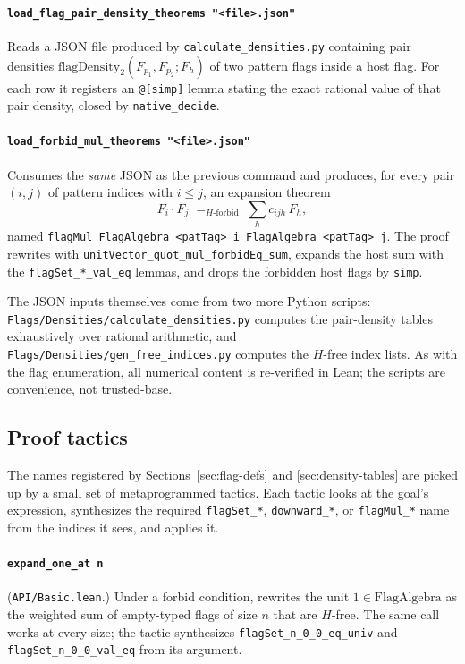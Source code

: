\documentclass[11pt]{article}
\begin{document}
\paragraph{\texttt{load\_flag\_pair\_density\_theorems "<file>.json"}}
Reads a JSON file produced by \texttt{calculate\_densities.py}
containing pair densities $\mathrm{flagDensity}_2(F_{p_1}, F_{p_2}; F_h)$
of two pattern flags inside a host flag. For each row it registers an
\texttt{@[simp]} lemma stating the exact rational value of that pair
density, closed by \texttt{native\_decide}.

\paragraph{\texttt{load\_forbid\_mul\_theorems "<file>.json"}}
Consumes the \emph{same} JSON as the previous command and produces, for
every pair $(i,j)$ of pattern indices with $i \le j$, an expansion
theorem
\[
  F_i \cdot F_j \;=_{H\text{-forbid}}\; \sum_h c_{ijh}\,F_h,
\]
named \texttt{flagMul\_FlagAlgebra\_<patTag>\_i\_FlagAlgebra\_<patTag>\_j}.
The proof rewrites with \texttt{unitVector\_quot\_mul\_forbidEq\_sum},
expands the host sum with the \texttt{flagSet\_*\_val\_eq} lemmas, and
drops the forbidden host flags by \texttt{simp}.

The JSON inputs themselves come from two more Python scripts:
\texttt{Flags/Densities/calculate\_densities.py} computes the pair-density
tables exhaustively over rational arithmetic, and
\texttt{Flags/Densities/gen\_free\_indices.py} computes the $H$-free index
lists. As with the flag enumeration, all numerical content is re-verified
in Lean; the scripts are convenience, not trusted-base.

\subsection{Proof tactics}
\label{sec:tactics}

The names registered by Sections~\ref{sec:flag-defs} and
\ref{sec:density-tables} are picked up by a small set of metaprogrammed
tactics. Each tactic looks at the goal's expression, synthesizes the
required \texttt{flagSet\_*}, \texttt{downward\_*}, or
\texttt{flagMul\_*} name from the indices it sees, and applies it.

\paragraph{\texttt{expand\_one\_at n}}
(\texttt{API/Basic.lean}.) Under a forbid condition, rewrites the unit
$1 \in \mathrm{FlagAlgebra}$ as the weighted sum of empty-typed flags of
size $n$ that are $H$-free. The same call works at every size; the tactic
synthesizes \texttt{flagSet\_n\_0\_0\_eq\_univ} and
\texttt{flagSet\_n\_0\_0\_val\_eq} from its argument.
\end{document}
